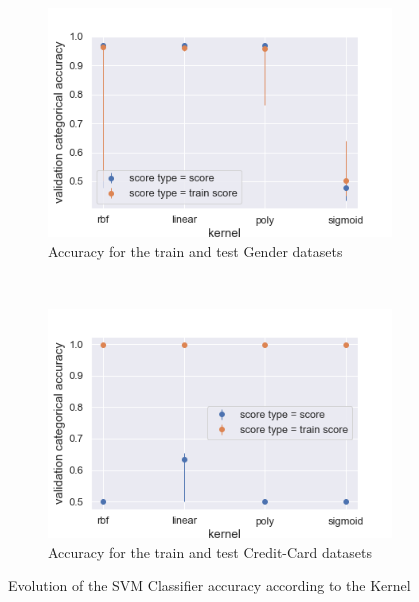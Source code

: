 \documentclass[10pt]{article}
\begin{document}
		\paragraph*{}
			\begin{figure}[h]
				\centering
				\begin{subfigure}[]{0.45\columnwidth}
					\centering
					\includegraphics[width=\linewidth]{../graphics/svm_gender_kernel_score_type_score_type.png}
					\caption{Accuracy for the train and test Gender datasets}
					\label{svm:g_train_vs_test}
				\end{subfigure}
				~
				\begin{subfigure}[]{0.45\columnwidth}
					\centering
					\includegraphics[width=\linewidth]{../graphics/svm_creditcard_kernel_score_type_score_type.png}
					\caption{Accuracy for the train and test Credit-Card datasets}
					\label{svm:cc_train_vs_test}
				\end{subfigure}
				\caption{Evolution of the SVM Classifier accuracy according to the Kernel}
				\label{svm:train_vs_test}
			\end{figure}
\end{document}

